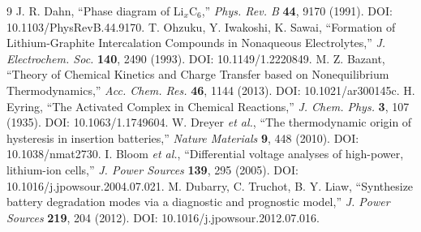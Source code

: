 \documentclass[11pt,a4paper]{article}
\begin{document}
\begin{thebibliography}{9}
 J. R. Dahn, ``Phase diagram of Li$_x$C$_6$,'' \emph{Phys. Rev. B} \textbf{44}, 9170 (1991). DOI: 10.1103/PhysRevB.44.9170.
 T. Ohzuku, Y. Iwakoshi, K. Sawai, ``Formation of Lithium-Graphite Intercalation Compounds in Nonaqueous Electrolytes,'' \emph{J. Electrochem. Soc.} \textbf{140}, 2490 (1993). DOI: 10.1149/1.2220849.
 M. Z. Bazant, ``Theory of Chemical Kinetics and Charge Transfer based on Nonequilibrium Thermodynamics,'' \emph{Acc. Chem. Res.} \textbf{46}, 1144 (2013). DOI: 10.1021/ar300145c.
 H. Eyring, ``The Activated Complex in Chemical Reactions,'' \emph{J. Chem. Phys.} \textbf{3}, 107 (1935). DOI: 10.1063/1.1749604.
 W. Dreyer \emph{et al.}, ``The thermodynamic origin of hysteresis in insertion batteries,'' \emph{Nature Materials} \textbf{9}, 448 (2010). DOI: 10.1038/nmat2730.
 I. Bloom \emph{et al.}, ``Differential voltage analyses of high-power, lithium-ion cells,'' \emph{J. Power Sources} \textbf{139}, 295 (2005). DOI: 10.1016/j.jpowsour.2004.07.021.
 M. Dubarry, C. Truchot, B. Y. Liaw, ``Synthesize battery degradation modes via a diagnostic and prognostic model,'' \emph{J. Power Sources} \textbf{219}, 204 (2012). DOI: 10.1016/j.jpowsour.2012.07.016.
\end{thebibliography}
\end{document}
